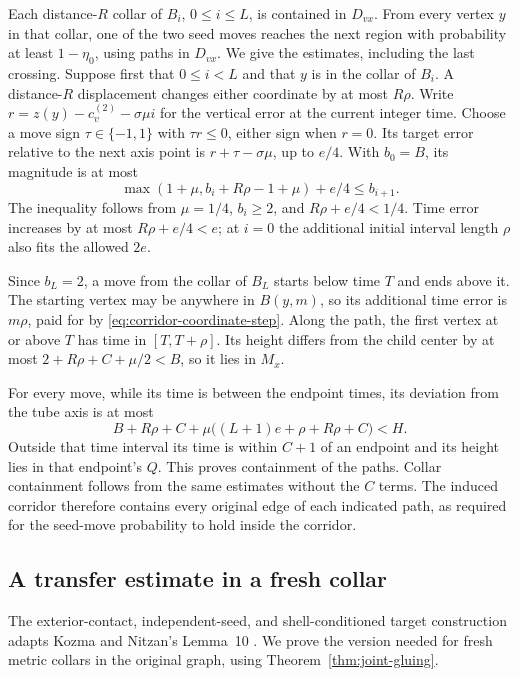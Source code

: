 Each distance-$R$ collar of $B_i$, $0\le i\le L$, is contained in
$D_{vx}$. From every vertex $y$ in that collar, one of the two seed
moves reaches the next region with probability at least $1-\eta_0$,
using paths in $D_{vx}$. We give the estimates, including the last
crossing. Suppose first that $0\le i<L$ and that $y$ is in the
collar of $B_i$. A distance-$R$ displacement changes either coordinate
by at most $R\rho$. Write
$r=z(y)-c_v^{(2)}-\sigma\mu i$ for the vertical error at the current
integer time. Choose a move sign $\tau\in\{-1,1\}$ with $\tau r\le0$,
either sign when $r=0$. Its target error relative to the next axis
point is $r+\tau-\sigma\mu$, up to $e/4$. With $b_0=B$, its magnitude
is at most
\[
 \max(1+\mu,b_i+R\rho-1+\mu)+e/4\le b_{i+1}.
\]
The inequality follows from $\mu=1/4$, $b_i\ge2$, and
$R\rho+e/4<1/4$. Time error increases by at most $R\rho+e/4<e$;
at $i=0$ the additional initial interval length $\rho$ also fits
the allowed $2e$.

Since $b_L=2$, a move from the collar of $B_L$ starts below time $T$
and ends above it. The starting vertex may be anywhere in $B(y,m)$,
so its additional time error is $m\rho$, paid for by
\eqref{eq:corridor-coordinate-step}. Along the path, the first vertex
at or above $T$ has time in $[T,T+\rho]$. Its height differs from
the child center by at most $2+R\rho+C+\mu/2<B$, so it lies in $M_x$.

For every move, while its time is between the endpoint times, its
deviation from the tube axis is at most
\[
 B+R\rho+C+\mu\bigl((L+1)e+\rho+R\rho+C\bigr)<H.
\]
Outside that time interval its time is within $C+1$ of an endpoint
and its height lies in that endpoint's $Q$. This proves containment
of the paths. Collar containment follows from the same estimates
without the $C$ terms. The induced corridor therefore contains every
original edge of each indicated path, as required for the seed-move
probability to hold inside the corridor.



\subsection{A transfer estimate in a fresh collar}

The exterior-contact, independent-seed, and shell-conditioned target
construction adapts Kozma and Nitzan's Lemma~10
\cite[Section~4]{KozmaNitzan2024}. We prove the version needed for fresh
metric collars in the original graph, using Theorem~\ref{thm:joint-gluing}.

